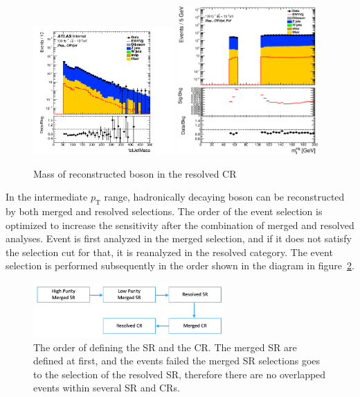 \begin{figure}[H]
    \centering
    \includegraphics[width=0.48\textwidth]{figures/2lep/dataMC/C_0ptag1pfat0pjet_0ptv_CRVjet_fatJetMass_Log}
    \includegraphics[width=0.48\textwidth]{figures/2lep/dataMC/C_0ptag2pjet_0ptv_CRVjet_Fid_MVHadRes_Log}
    \caption{Mass of reconstructed boson in the resolved CR}
    \label{fig:CRVjet}
\end{figure}

In the intermediate $p_\mathrm{T}$ range, hadronically decaying boson can be reconstructed by both merged and resolved selections.
The order of the event selection is optimized to increase the sensitivity after the combination of merged and resolved analyses. 
Event is first analyzed in the merged selection, and if it does not satisfy the selection cut for that, it is reanalyzed in the resolved category.
The event selection is performed subsequently in the order shown in the diagram in figure~\ref{fig:order}.
\begin{figure}[H]
    \centering
    \includegraphics[width=0.65\textwidth]{figures/order}
    \caption{The order of defining the SR and the CR. The merged SR are defined at first, and the events failed the merged SR selections goes to the selection of the resolved SR, therefore there are no overlapped events within several SR and CRs.}
    \label{fig:order}
\end{figure}

